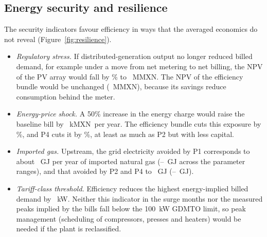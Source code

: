 \documentclass[processes,article,submit,pdftex,moreauthors]{Definitions/mdpi}
\newcommand{\MXN}{MXN}
\begin{document}
\subsection{Energy security and resilience}
\label{sec:resil}
The security indicators favour efficiency in ways that the averaged economics do not reveal (Figure~\ref{fig:resilience}).
\begin{itemize}
\item \emph{Regulatory stress.} If distributed-generation output no longer reduced billed demand, for example under a move from net metering to net billing, the NPV of the PV array would fall by \nPVStressDrop\% to \nNPVPVStress~M\MXN. The NPV of the efficiency bundle would be unchanged (\nNPVEEStress~M\MXN), because its savings reduce consumption behind the meter.
\item \emph{Energy-price shock.} A 50\% increase in the energy charge would raise the baseline bill by \nShockZero~k\MXN\ per year. The efficiency bundle cuts this exposure by \nShockCutOne\%, and P4 cuts it by \nShockCutFour\%, at least as much as P2 but with less capital.
\item \emph{Imported gas.} Upstream, the grid electricity avoided by P1 corresponds to about \nGasOne~GJ per year of imported natural gas (\nGasOneLo--\nGasOneHi~GJ across the parameter ranges), and that avoided by P2 and P4 to \nGasTwo~GJ (\nGasTwoLo--\nGasTwoHi~GJ).
\item \emph{Tariff-class threshold.} Efficiency reduces the highest energy-implied billed demand by \nPeakCutOne~kW. Neither this indicator in the surge months nor the measured peaks implied by the bills fall below the 100~kW GDMTO limit, so peak management (scheduling of compressors, presses and heaters) would be needed if the plant is reclassified.
\end{itemize}
\end{document}
